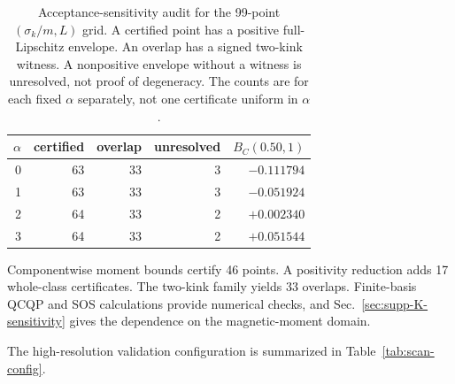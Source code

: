 \documentclass[12pt]{iopjournal}
\newenvironment{ruledtabular}{\centering}{}
\newcommand{\colrule}{\hline}
\begin{document}
\begin{table}[h]
\caption{Acceptance-sensitivity audit for the 99-point $(\sigma_k/m,L)$ grid. A certified point has a positive full-Lipschitz envelope. An overlap has a signed two-kink witness. A nonpositive envelope without a witness is unresolved, not proof of degeneracy. The counts are for each fixed $\alpha$ separately, not one certificate uniform in $\alpha$.}
\label{tab:acceptance-sensitivity}
\begin{ruledtabular}
\begin{tabular}{r r r r r}
$\alpha$ & certified & overlap & unresolved & $B_C(0.50,1)$ \\
\colrule
0 & 63 & 33 & 3 & $-0.111794$ \\
1 & 63 & 33 & 3 & $-0.051924$ \\
2 & 64 & 33 & 2 & $+0.002340$ \\
3 & 64 & 33 & 2 & $+0.051544$ \\
\end{tabular}
\end{ruledtabular}
\end{table}

Componentwise moment bounds certify 46 points. A positivity reduction adds 17 whole-class certificates. The two-kink family yields 33 overlaps. Finite-basis QCQP and SOS calculations provide numerical checks, and Sec.~\ref{sec:supp-K-sensitivity} gives the dependence on the magnetic-moment domain.

The high-resolution validation configuration is summarized in Table~\ref{tab:scan-config}.
\end{document}

